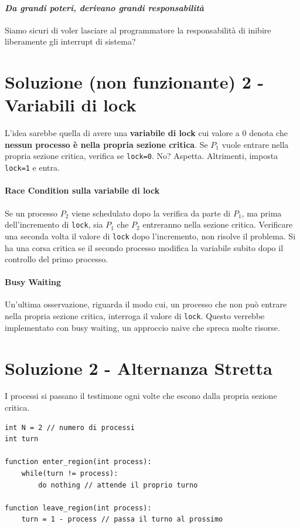 \documentclass{report}
\begin{document}
\paragraph{\textit{Da grandi poteri, derivano grandi responsabilità}} Siamo sicuri di voler lasciare al programmatore la responsabilità di inibire liberamente gli interrupt di sistema?

\section{Soluzione (non funzionante) 2 - Variabili di lock}

L'idea sarebbe quella di avere una \textbf{variabile di lock} cui valore a 0 denota che \textbf{nessun processo è nella propria sezione critica}. Se $P_1$ vuole entrare nella propria sezione critica, verifica se \verb|lock=0|. No? Aspetta. Altrimenti, imposta \verb|lock=1| e entra. 

\paragraph{Race Condition sulla variabile di lock}
Se un processo $P_2$ viene schedulato dopo la verifica da parte di $P_1$, ma prima dell'incremento di \verb|lock|, sia $P_1$ che $P_2$ entreranno nella sezione critica.  
Verificare una seconda volta il valore di \verb|lock| dopo l'incremento, non risolve il problema. Si ha una corsa critica se il secondo processo modifica la variabile subito dopo il controllo del primo processo.

\paragraph{Busy Waiting}
Un'ultima osservazione, riguarda il modo cui, un processo che non può entrare nella propria sezione critica, interroga il valore di \verb|lock|. Questo verrebbe implementato con busy waiting, un approccio naive che spreca molte risorse.

\section{Soluzione 2 - Alternanza Stretta}
I processi si passano il testimone ogni volte che escono dalla propria sezione critica.

\begin{verbatim}
int N = 2 // numero di processi
int turn

function enter_region(int process):
    while(turn != process):
        do nothing // attende il proprio turno

function leave_region(int process):
    turn = 1 - process // passa il turno al prossimo
    
\end{verbatim}
\end{document}
